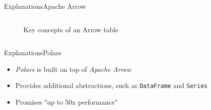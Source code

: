 \begin{frame}[t]{Explanations}{Apache Arrow}
\begin{columns}[t]
\begin{column}{0.6\linewidth}
{\begin{figure}
\begin{tikzpicture}
					\end{tikzpicture}
					\caption{Key concepts of an Arrow table\footnotemark}
				\end{figure}
			}
		\end{column}
		\hfill
	\end{columns}
\end{frame}
\begin{frame}[t]{Explanations}{Polars}
	\begin{itemize}
		\item \emph{Polars} is built on top of \emph{Apache Arrow}\footnotemark[1]
		\item Provides additional abstractions, such as \Verb|DataFrame| and \Verb|Series|\footnotemark[1]
		\item Promises "up to 50x performance"\footnotemark[1]
	\end{itemize}
\end{frame}


